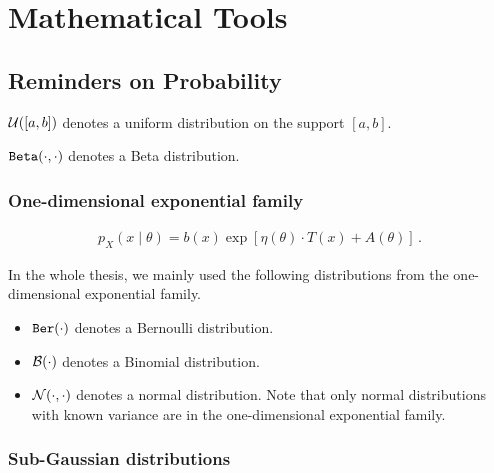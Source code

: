 \chapter{Mathematical Tools}\label{CHAP:MATHS}


\section{Reminders on Probability}\label{app:maths.proba}

$\mathcal{U}([a,b])$ denotes a uniform distribution on the support $[a,b]$.

$\texttt{Beta}(\cdot,\cdot)$ denotes a Beta distribution.

\subsection{One-dimensional exponential family}\label{app:maths.proba.exponential}

\begin{align}
    p_{X}(x \mid \theta ) = b(x) \exp \left[\eta (\theta ) \cdot T(x) + A(\theta )\right]\,.
\end{align}

In the whole thesis, we mainly used the following distributions from the one-dimensional exponential family.

\begin{itemize}
    \item $\texttt{Ber}(\cdot)$ denotes a Bernoulli distribution.
    \item $\mathcal{B}(\cdot)$ denotes a Binomial distribution.
    \item $\mathcal{N}(\cdot,\cdot)$ denotes a normal distribution. Note that only normal distributions with known variance are in the one-dimensional exponential family.
\end{itemize}


\subsection{Sub-Gaussian distributions}\label{app:maths.proba.subgaussian}

